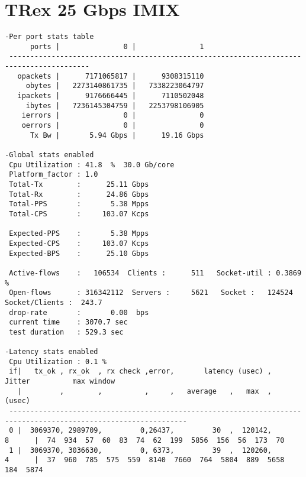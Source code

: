 \section{TRex 25 Gbps IMIX}

\begin{lstlisting}
-Per port stats table 
      ports |               0 |               1 
 -----------------------------------------------------------------------------------------
   opackets |      7171065817 |      9308315110 
     obytes |   2273140861735 |   7338223064797 
   ipackets |      9176666445 |      7110502048 
     ibytes |   7236145304759 |   2253798106905 
    ierrors |               0 |               0 
    oerrors |               0 |               0 
      Tx Bw |       5.94 Gbps |      19.16 Gbps 

-Global stats enabled 
 Cpu Utilization : 41.8  %  30.0 Gb/core 
 Platform_factor : 1.0  
 Total-Tx        :      25.11 Gbps  
 Total-Rx        :      24.86 Gbps  
 Total-PPS       :       5.38 Mpps  
 Total-CPS       :     103.07 Kcps  

 Expected-PPS    :       5.38 Mpps  
 Expected-CPS    :     103.07 Kcps  
 Expected-BPS    :      25.10 Gbps  

 Active-flows    :   106534  Clients :      511   Socket-util : 0.3869 %    
 Open-flows      : 316342112  Servers :     5621   Socket :   124524 Socket/Clients :  243.7 
 drop-rate       :       0.00  bps   
 current time    : 3070.7 sec  
 test duration   : 529.3 sec  

-Latency stats enabled 
 Cpu Utilization : 0.1 %  
 if|   tx_ok , rx_ok  , rx check ,error,       latency (usec) ,    Jitter          max window 
   |         ,        ,          ,     ,   average   ,   max  ,    (usec)                     
 ---------------------------------------------------------------------------------------------------------------- 
 0 |  3069370, 2989709,         0,26437,         30  ,  120142,       8      |  74  934  57  60  83  74  62  199  5856  156  56  173  70 
 1 |  3069370, 3036630,         0, 6373,         39  ,  120260,       4      |  37  960  785  575  559  8140  7660  764  5804  889  5658  184  5874
\end{lstlisting}